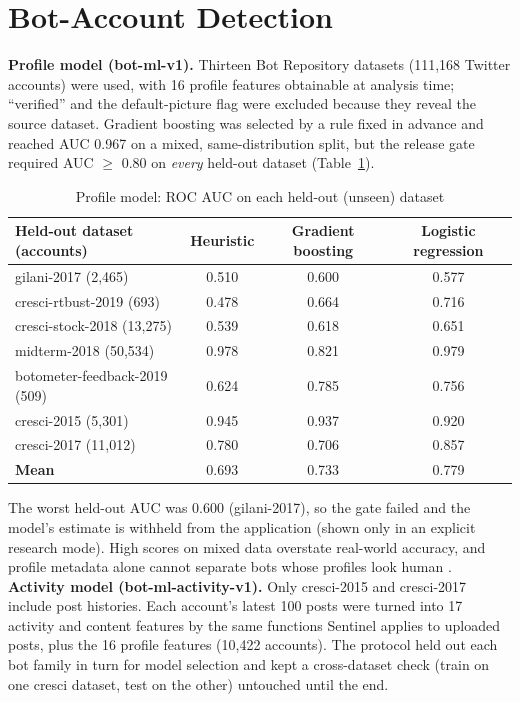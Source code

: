 \section{Bot-Account Detection}
\noindent\textbf{Profile model (bot-ml-v1).} Thirteen Bot Repository datasets (111,168 Twitter accounts) were used, with 16 profile features obtainable at analysis time; ``verified'' and the default-picture flag were excluded because they reveal the source dataset. Gradient boosting was selected by a rule fixed in advance and reached AUC 0.967 on a mixed, same-distribution split, but the release gate required AUC $\ge$ 0.80 on \emph{every} held-out dataset (Table~\ref{tab:bot1}).

\begin{table}[H]
\centering
\small
\renewcommand{\arraystretch}{1.12}
\caption{Profile model: ROC AUC on each held-out (unseen) dataset}
\label{tab:bot1}
\begin{tabular}{|l|c|c|c|}
\hline
\textbf{Held-out dataset (accounts)} & \textbf{Heuristic} & \textbf{Gradient boosting} & \textbf{Logistic regression} \\ \hline
gilani-2017 (2,465) & 0.510 & 0.600 & 0.577 \\ \hline
cresci-rtbust-2019 (693) & 0.478 & 0.664 & 0.716 \\ \hline
cresci-stock-2018 (13,275) & 0.539 & 0.618 & 0.651 \\ \hline
midterm-2018 (50,534) & 0.978 & 0.821 & 0.979 \\ \hline
botometer-feedback-2019 (509) & 0.624 & 0.785 & 0.756 \\ \hline
cresci-2015 (5,301) & 0.945 & 0.937 & 0.920 \\ \hline
cresci-2017 (11,012) & 0.780 & 0.706 & 0.857 \\ \hline
\textbf{Mean} & 0.693 & 0.733 & 0.779 \\ \hline
\end{tabular}
\end{table}

\noindent The worst held-out AUC was 0.600 (gilani-2017), so the gate failed and the model's estimate is withheld from the application (shown only in an explicit research mode). High scores on mixed data overstate real-world accuracy, and profile metadata alone cannot separate bots whose profiles look human \cite{yang2020}.\\

\noindent\textbf{Activity model (bot-ml-activity-v1).} Only cresci-2015 and cresci-2017 include post histories. Each account's latest 100 posts were turned into 17 activity and content features by the same functions Sentinel applies to uploaded posts, plus the 16 profile features (10,422 accounts). The protocol held out each bot family in turn for model selection and kept a cross-dataset check (train on one cresci dataset, test on the other) untouched until the end.


